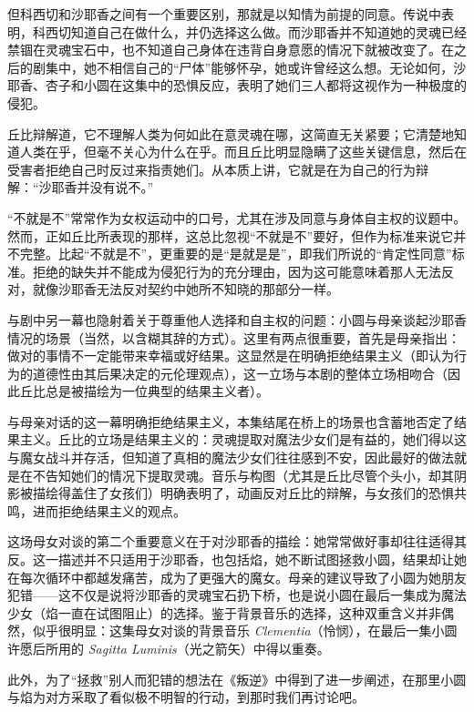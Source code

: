 但科西切和沙耶香之间有一个重要区别，那就是以知情为前提的同意。传说中表明，科西切知道自己在做什么，并仍选择这么做。而沙耶香并不知道她的灵魂已经禁锢在灵魂宝石中，也不知道自己身体在违背自身意愿的情况下就被改变了。在之后的剧集中，她不相信自己的“尸体”能够怀孕，她或许曾经这么想。无论如何，沙耶香、杏子和小圆在这集中的恐惧反应，表明了她们三人都将这视作为一种极度的侵犯。  

丘比辩解道，它不理解人类为何如此在意灵魂在哪，这简直无关紧要；它清楚地知道人类在乎，但毫不关心为什么在乎。而且丘比明显隐瞒了这些关键信息，然后在受害者拒绝自己时反过来指责她们。从本质上讲，它就是在为自己的行为辩解：“沙耶香并没有说不。”  

“不就是不”常常作为女权运动中的口号，尤其在涉及同意与身体自主权的议题中\cite{37}。然而，正如丘比所表现的那样，这总比忽视“不就是不”要好，但作为标准来说它并不完整。比起“不就是不”，更重要的是“是就是是”，即我们所说的“肯定性同意”标准\cite{ref37}。拒绝的缺失并不能成为侵犯行为的充分理由，因为这可能意味着那人无法反对，就像沙耶香无法反对契约中她所不知晓的那部分一样。  

与剧中另一幕也隐射着关于尊重他人选择和自主权的问题：小圆与母亲谈起沙耶香情况的场景（当然，以含糊其辞的方式）。这里有两点很重要，首先是母亲指出：做对的事情不一定能带来幸福或好结果。这显然是在明确拒绝结果主义（即认为行为的道德性由其后果决定的元伦理观点\cite{ref38}），这一立场与本剧的整体立场相吻合（因此丘比总是被描绘为一位典型的结果主义者）。  

与母亲对话的这一幕明确拒绝结果主义，本集结尾在桥上的场景也含蓄地否定了结果主义。丘比的立场是结果主义的：灵魂提取对魔法少女们是有益的，她们得以这与魔女战斗并存活，但知道了真相的魔法少女们往往感到不安，因此最好的做法就是在不告知她们的情况下提取灵魂。音乐与构图（尤其是丘比尽管个头小，却其阴影被描绘得盖住了女孩们）明确表明了，动画反对丘比的辩解，与女孩们的恐惧共鸣，进而拒绝结果主义的观点。  

这场母女对谈的第二个重要意义在于对沙耶香的描绘：她常常做好事却往往适得其反。这一描述并不只适用于沙耶香，也包括焰，她不断试图拯救小圆，结果却让她在每次循环中都越发痛苦，成为了更强大的魔女。母亲的建议导致了小圆为她朋友犯错——这不仅是说将沙耶香的灵魂宝石扔下桥，也是说小圆在最后一集成为魔法少女（焰一直在试图阻止）的选择。鉴于背景音乐的选择，这种双重含义并非偶然，似乎很明显：这集母女对谈的背景音乐 \emph{Clementia}（怜悯），在最后一集小圆许愿后所用的 \emph{Sagitta Luminis}（光之箭矢）中得以重奏。  

此外，为了“拯救”别人而犯错的想法在《叛逆》中得到了进一步阐述，在那里小圆与焰为对方采取了看似极不明智的行动，到那时我们再讨论吧。
